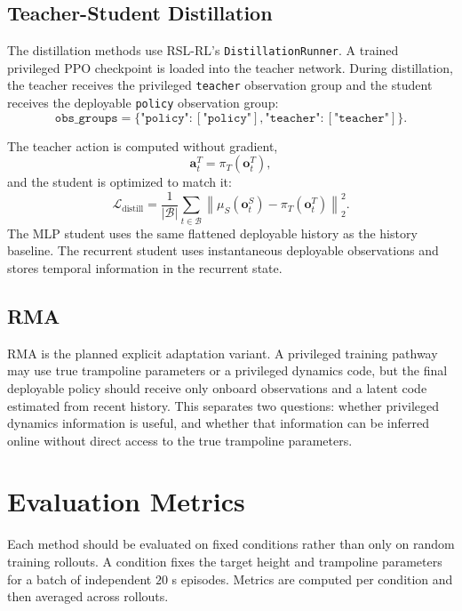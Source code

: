 \documentclass[11pt, a4paper]{article}
\begin{document}
\subsection{Teacher-Student Distillation}

The distillation methods use RSL-RL's \texttt{DistillationRunner}. A trained
privileged PPO checkpoint is loaded into the teacher network. During
distillation, the teacher receives the privileged \texttt{teacher} observation
group and the student receives the deployable \texttt{policy} observation group:
\[
    \texttt{obs\_groups}
    =
    \{\texttt{"policy"}:[\texttt{"policy"}],
      \texttt{"teacher"}:[\texttt{"teacher"}]\}.
\]

The teacher action is computed without gradient,
\[
    \bm{a}^{T}_t = \pi_T(\bm{o}^{T}_t),
\]
and the student is optimized to match it:
\[
    \mathcal{L}_{\mathrm{distill}}
    =
    \frac{1}{|\mathcal{B}|}
    \sum_{t\in\mathcal{B}}
    \left\|
        \mu_S(\bm{o}^{S}_t)-\pi_T(\bm{o}^{T}_t)
    \right\|_2^2.
\]
The MLP student uses the same flattened deployable history as the history
baseline. The recurrent student uses instantaneous deployable observations and
stores temporal information in the recurrent state.

\subsection{RMA}

RMA is the planned explicit adaptation variant. A privileged training pathway
may use true trampoline parameters or a privileged dynamics code, but the final
deployable policy should receive only onboard observations and a latent code
estimated from recent history. This separates two questions: whether privileged
dynamics information is useful, and whether that information can be inferred
online without direct access to the true trampoline parameters.

\section{Evaluation Metrics}

Each method should be evaluated on fixed conditions rather than only on random
training rollouts. A condition fixes the target height and trampoline
parameters for a batch of independent $20$ s episodes. Metrics are computed per
condition and then averaged across rollouts.
\end{document}
